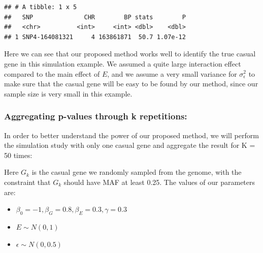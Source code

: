 \documentclass[
]{article}
\providecommand{\tightlist}{%
  \setlength{\itemsep}{0pt}\setlength{\parskip}{0pt}}
\begin{document}
\begin{verbatim}
## # A tibble: 1 x 5
##   SNP              CHR        BP stats        P
##   <chr>          <int>     <int> <dbl>    <dbl>
## 1 SNP4-164081321     4 163861871  50.7 1.07e-12
\end{verbatim}

Here we can see that our proposed method works well to identify the true
casual gene in this simulation example. We assumed a quite large
interaction effect compared to the main effect of \(E\), and we assume a
very small variance for \(\sigma_\epsilon^2\) to make sure that the
casual gene will be easy to be found by our method, since our sample
size is very small in this example.

\clearpage

\hypertarget{aggregating-p-values-through-k-repetitions}{%
\subsubsection{Aggregating p-values through k
repetitions:}\label{aggregating-p-values-through-k-repetitions}}

In order to better understand the power of our proposed method, we will
perform the simulation study with only one casual gene and aggregate the
result for K = 50 times:

Here \(G_k\) is the casual gene we randomly sampled from the genome,
with the constraint that \(G_k\) should have MAF at least 0.25. The
values of our parameters are:

\begin{itemize}
\tightlist
\item
  \(\beta_0= -1, \beta_G=0.8, \beta_E= 0.3,\gamma=0.3\)
\item
  \(E \sim N(0,1)\)
\item
  \(\epsilon \sim N(0,0.5)\)
\end{itemize}
\end{document}
